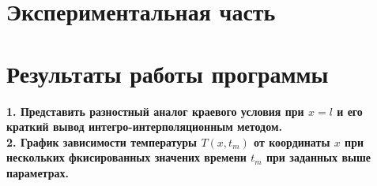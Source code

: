 \documentclass[a4paper,oneside,12pt]{extreport}
\begin{document}


\newpage 

\section{Экспериментальная часть}

\section*{Результаты работы программы}

\textbf{1. Представить разностный аналог краевого условия при $x = l$ и его краткий вывод интегро-интерполяционным методом.}\\


\textbf{2. График зависимости температуры $T(x, t_{m})$ от координаты $x$ при нескольких фкисированных значених времени $t_{m}$ при заданных выше параметрах. }\\

\end{document}
